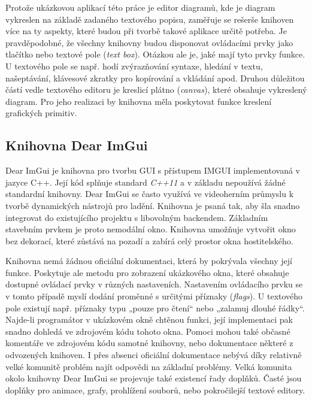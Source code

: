\documentclass[FM,DP]{tulthesis}
\begin{document}
	Protože ukázkovou aplikací této práce je editor diagramů, kde je diagram vykreslen na základě zadaného textového popisu, zaměřuje se rešerše knihoven více na ty aspekty, které budou při tvorbě takové aplikace určitě potřeba. Je pravděpodobné, že všechny knihovny budou disponovat ovládacími prvky jako tlačítko nebo textové pole (\textit{text box}). Otázkou ale je, jaké mají tyto prvky funkce. U textového pole se např. hodí zvýrazňování syntaxe, hledání v textu, našeptávání, klávesové zkratky pro kopírování a vkládání apod. Druhou důležitou částí vedle textového editoru je kreslicí plátno (\textit{canvas}), které obsahuje vykreslený diagram. Pro jeho realizaci by knihovna měla poskytovat funkce kreslení grafických primitiv.
	
	\subsection{Knihovna Dear ImGui}\label{Chapter2SectionDearImGui}
	
	Dear ImGui \cite{online_imguiwiki} je knihovna pro tvorbu GUI s přístupem IMGUI implementovaná v jazyce C++. Její kód splňuje standard \textit{C++11} a v základu nepoužívá žádné standardní knihovny. Dear ImGui se často využívá ve videoherním průmyslu k tvorbě dynamických nástrojů pro ladění. Knihovna je psaná tak, aby šla snadno integrovat do existujícího projektu s libovolným backendem. Základním stavebním prvkem je proto nemodální okno. Knihovna umožňuje vytvořit okno bez dekorací, které zůstává na pozadí a zabírá celý prostor okna hostitelského.
	
	Knihovna nemá žádnou oficiální dokumentaci, která by pokrývala všechny její funkce. Poskytuje ale metodu pro zobrazení ukázkového okna, které obsahuje dostupné ovládací prvky v různých nastaveních. Nastavením ovládacího prvku se v tomto případě myslí dodání proměnné s určitými příznaky (\textit{flags}). U textového pole existují např. příznaky typu „pouze pro čtení“ nebo „zalamuj dlouhé řádky“. Najde-li programátor v ukázkovém okně chtěnou funkci, její implementaci pak snadno dohledá ve zdrojovém kódu tohoto okna. Pomoci mohou také občasné komentáře ve zdrojovém kódu samotné knihovny, nebo dokumentace některé z odvozených knihoven. I přes absenci oficiální dokumentace nebývá díky relativně velké komunitě problém najít odpovědi na základní problémy. Velká komunita okolo knihovny Dear ImGui se projevuje také existencí řady doplňků. Časté jsou doplňky pro animace, grafy, prohlížení souborů, nebo pokročilejší textové editory.
	
\end{document}
